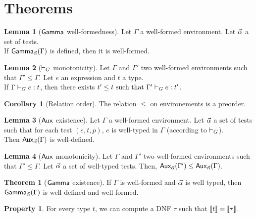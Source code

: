 \documentclass[a4paper]{article}
\theoremstyle{definition}
\newtheorem{theorem}{Theorem}
\newtheorem{lemma}{Lemma}
\newtheorem{property}{Property}
\newtheorem{corollary}{Corollary}
\begin{document}
    \section{Theorems}

        \begin{lemma}[$\textsf{Gamma}_{} $ well-formedness]
          Let $\Gamma$ a well-formed environment. Let $\vec \alpha$ a set of tests.\\
          If $\textsf{Gamma}_{\vec \alpha}(\Gamma)$ is defined, then it is well-formed.
        \end{lemma}

        \begin{lemma}[$\vdash_G$ monotonicity]
          Let $\Gamma$ and $\Gamma'$ two well-formed environments such that $\Gamma' \leq \Gamma$.
          Let $e$ an expression and $t$ a type.\\
          If $\Gamma \vdash_G e : t$, then there exists $t'\leq t \text{ such that } \Gamma' \vdash_G e : t'$.
        \end{lemma}

        \begin{corollary}[Relation order]
          The relation $\leq$ on environements is a preorder.
        \end{corollary}

        \begin{lemma}[$\textsf{Aux}_{} $ existence]
          Let $\Gamma$ a well-formed environment.
          Let $\vec \alpha$ a set of tests such that for each test $(e,t,p)$, $e$ is well-typed in $\Gamma$ (according to $\vdash_G$).\\
          Then $\textsf{Aux}_{\vec \alpha}(\Gamma)$ is well-defined.
        \end{lemma}

        \begin{lemma}[$\textsf{Aux}_{}$ monotonicity]
          Let $\Gamma$ and $\Gamma'$ two well-formed environments such that $\Gamma' \leq \Gamma$.
          Let $\vec \alpha$ a set of well-typed tests. Then, $\textsf{Aux}_{\vec \alpha}(\Gamma') \leq \textsf{Aux}_{\vec \alpha}(\Gamma)$.
        \end{lemma}

        \begin{theorem}[$\textsf{Gamma}_{}$ existence]
            If $\Gamma$ is well-formed and $\vec \alpha$ is well typed, then $\textsf{Gamma}_{\vec \alpha}(\Gamma)$ is well defined and well-formed.
        \end{theorem}

        \begin{property}
          For every type $t$, we can compute a DNF $\tau$ such that ${\llbracket t \rrbracket} = {\llbracket \tau \rrbracket}$.
        \end{property}
\end{document}
